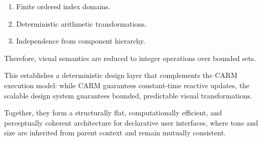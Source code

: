 \begin{enumerate}
    \item Finite ordered index domains.
    \item Deterministic arithmetic transformations.
    \item Independence from component hierarchy.
\end{enumerate}

Therefore, visual semantics are reduced to integer operations
over bounded sets.

This establishes a deterministic design layer
that complements the CARM execution model:
while CARM guarantees constant-time reactive updates,
the scalable design system guarantees bounded,
predictable visual transformations.

Together, they form a structurally flat,
computationally efficient, and perceptually coherent
architecture for declarative user interfaces, where tone and size are inherited from parent context and remain mutually consistent.
